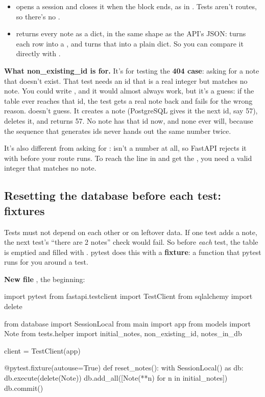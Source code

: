 \begin{itemize}
\item {} opens a session and closes it when the block ends, as in . Tests aren't routes, so there's no .
\item {} returns every note as a dict, in the same shape as the API's JSON:  turns each row into a , and  turns that into a plain dict. So you can compare it directly with .
\end{itemize}

\textbf{What non\_existing\_id is for.} It's for testing the \textbf{404 case}: asking for a note that doesn't exist. That test needs an id that is a real integer but matches no note. You could write , and it would almost always work, but it's a guess: if the table ever reaches that id, the test gets a real note back and fails for the wrong reason.  doesn't guess. It creates a note (PostgreSQL gives it the next id, say 57), deletes it, and returns 57. No note has that id now, and none ever will, because the sequence that generates ids never hands out the same number twice.

It's also different from asking for :  isn't a number at all, so FastAPI rejects it with  before your route runs. To reach the  line in  and get the , you need a valid integer that matches no note.

\subsection{Resetting the database before each test: fixtures}

Tests must not depend on each other or on leftover data. If one test adds a note, the next test's ``there are 2 notes'' check would fail. So before \emph{each} test, the  table is emptied and filled with . pytest does this with a \textbf{fixture}: a function that pytest runs for you around a test.

\textbf{New file} , the beginning:

\begin{py}
import pytest
from fastapi.testclient import TestClient
from sqlalchemy import delete

from database import SessionLocal
from main import app
from models import Note
from tests.helper import initial_notes, non_existing_id, notes_in_db

client = TestClient(app)


@pytest.fixture(autouse=True)
def reset_notes():
	with SessionLocal() as db:
		db.execute(delete(Note))
		db.add_all([Note(**n) for n in initial_notes])
		db.commit()
\end{py}

